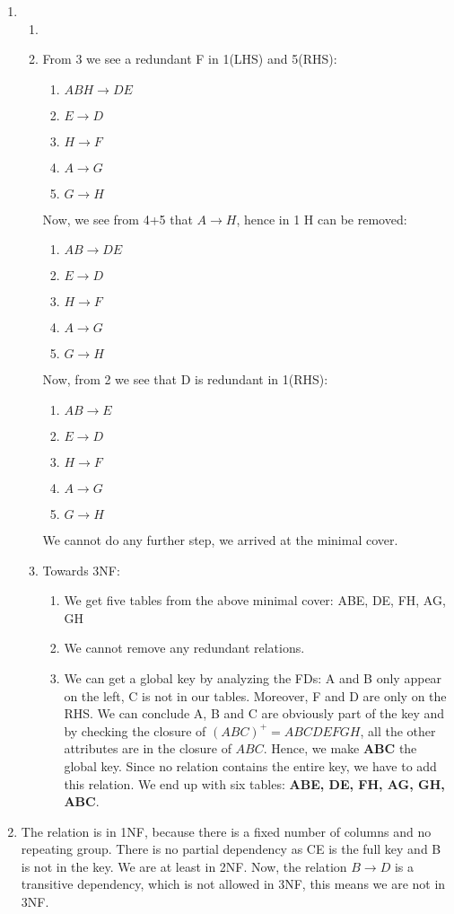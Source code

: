 \documentclass[12pt]{extarticle}
\begin{document}
\begin{flushleft}
\begin{enumerate}
\item 
\begin{enumerate}
\item 
\item From 3 we see a redundant F in 1(LHS) and 5(RHS):
\begin{enumerate}
\item $ABH\rightarrow DE$
\item $E\rightarrow D$
\item $H \rightarrow F$
\item $A\rightarrow G$
\item $G\rightarrow H$
\end{enumerate}
Now, we see from 4+5 that $A\rightarrow H$, hence in 1 H can be removed:
\begin{enumerate}
\item $AB\rightarrow DE$
\item $E\rightarrow D$
\item $H \rightarrow F$
\item $A\rightarrow G$
\item $G\rightarrow H$
\end{enumerate}

Now, from 2 we see that D is redundant in 1(RHS):
\begin{enumerate}
\item $AB\rightarrow E$
\item $E\rightarrow D$
\item $H \rightarrow F$
\item $A\rightarrow G$
\item $G\rightarrow H$
\end{enumerate}
We cannot do any further step, we arrived at the minimal cover.

 \item Towards 3NF:
 \begin{enumerate} \item 
We get five tables from the above minimal cover: ABE, DE, FH, AG, GH
 \item We cannot remove any redundant relations.
 \item We can get a global key by analyzing the FDs: A and B only appear on the left, C is not in our tables. Moreover, F and D are only on the RHS. We can conclude A, B and C are obviously part of the key and by checking the closure of $(ABC)^+=ABCDEFGH$, all the other attributes are in the closure of $ABC$. Hence, we make \textbf{ABC} the global key. 
Since no relation contains the entire key, we have to add this relation. We end up with six tables: \textbf{ABE, DE, FH, AG, GH, ABC}.
\end{enumerate}
\end{enumerate}
\item
The relation is in 1NF, because there is a fixed number of columns and no repeating group. There is no partial dependency as CE is the full key and B is not in the key. We are at least in  2NF. Now, the relation $B\rightarrow D$ is a transitive dependency, which is not allowed in 3NF, this means we are not in 3NF.
\end{enumerate}
\end{flushleft}
\end{document}
